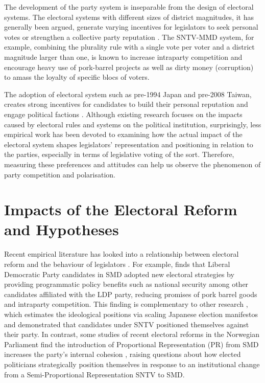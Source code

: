 The development of the party system is inseparable from the design of electoral systems. The electoral systems with different sizes of district magnitudes, it has generally been argued, generate varying incentives for legislators to seek personal votes or strengthen a collective party reputation \citep[][]{Andre2015,Andre2015, Carey1995, Cox1997}. The SNTV-MMD system, for example, combining the plurality rule with a single vote per voter and a district magnitude larger than one, is known to increase intraparty competition \citep{Calvo2011, Cox1990, Reed2003, Carey1995, Merrill2002} and encourage heavy use of pork-barrel projects \citep[e.g.][]{Reed2005, Shugart2005, Hirano2006} as well as dirty money (corruption) \citep[][]{Chang2007} to amass the loyalty of specific blocs of voters.

The adoption of electoral system such as pre-1994 Japan and pre-2008 Taiwan, creates strong incentives for candidates to build their personal reputation \citep[][]{Batto2005, Carey1995,Huang2017,Lin2016, Hirano2006} and engage political factions \citep[][]{Batto2016}.  Although existing research focuses on the impacts caused by electoral rules and systems on the political institution, surprisingly, less empirical work has been devoted to examining how the actual impact of the electoral system shapes legislators' representation and positioning in relation to the parties, especially in terms of legislative voting of the sort. Therefore, measuring these preferences and attitudes can help us observe the phenomenon of party competition and polarisation. 

\section*{\centering Impacts of the Electoral Reform and Hypotheses}

Recent empirical literature has looked into a relationship between electoral reform and the behaviour of legislators \citep[e.g.][]{Cox2019, Catalinac2016, Catalinac2017}. For example, \citet{Catalinac2016} finds that Liberal Democratic Party candidates in SMD adopted new electoral strategies by providing programmatic policy benefits such as national security among other candidates affiliated with the LDP party, reducing promises of pork barrel goods and intraparty competition. This finding is complementary to other research \citet{Catalinac2017}, which estimates the ideological positions via scaling Japanese election manifestos and demonstrated that candidates under SNTV positioned themselves against their party. In contrast, some studies of recent electoral reforms in the Norwegian Parliament find the introduction of Proportional Representation (PR) from SMD increases the party's internal cohesion \citep{Hoyland2019, Cox2019}, raising questions about how elected politicians strategically position themselves in response to an institutional change from a Semi-Proportional Representation \textemdash SNTV to SMD. 

